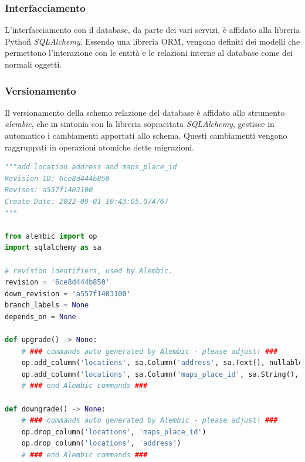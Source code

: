 \subsubsection{Interfacciamento}
L'interfacciamento con il database, da parte dei vari servizi, è affidato alla libreria Python\G{} \textit{SQLAlchemy}.
Essendo una libreria ORM\G{}, vengono definiti dei modelli che permettono l'interazione con le entità e le relazioni
interne al database come dei normali oggetti.

\subsubsection{Versionamento}
Il versionamento della schemo relazione del database è affidato allo strumento \textit{alembic}, che in
sintonia con la libreria sopracitata \textit{SQLAlchemy}, gestisce in automatico i cambiamenti apportati allo schema.
Questi cambiamenti vengono raggruppati in operazioni atomiche dette migrazioni.

\begin{lstlisting}[language=Python, caption=Esempio di migrazione autogenerata]
"""add location address and maps_place_id
Revision ID: 6ce8d444b850
Revises: a557f1403100
Create Date: 2022-09-01 10:43:05.074767
"""

from alembic import op
import sqlalchemy as sa

# revision identifiers, used by Alembic.
revision = '6ce8d444b850'
down_revision = 'a557f1403100'
branch_labels = None
depends_on = None

def upgrade() -> None:
    # ### commands auto generated by Alembic - please adjust! ###
    op.add_column('locations', sa.Column('address', sa.Text(), nullable=True))
    op.add_column('locations', sa.Column('maps_place_id', sa.String(), nullable=True))
    # ### end Alembic commands ###

def downgrade() -> None:
    # ### commands auto generated by Alembic - please adjust! ###
    op.drop_column('locations', 'maps_place_id')
    op.drop_column('locations', 'address')
    # ### end Alembic commands ###
\end{lstlisting}
